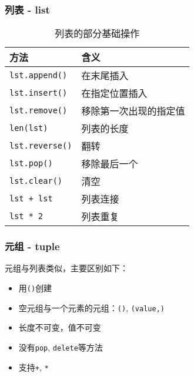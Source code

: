 \documentclass[10pt]{beamer}
\begin{document}
\begin{frame}
    \frametitle{列表 - list}

    \begin{table}
    \caption{列表的部分基础操作}    
    \begin{tabular}{ll}
    \toprule
    方法 & 含义 \\ \midrule
    \texttt{lst.append()} & 在末尾插入 \\
    \texttt{lst.insert()} & 在指定位置插入 \\
    \texttt{lst.remove()} & 移除第一次出现的指定值 \\
    \texttt{len(lst)} & 列表的长度 \\
    \texttt{lst.reverse()} & 翻转 \\
    \texttt{lst.pop()} & 移除最后一个 \\
    \texttt{lst.clear()} & 清空 \\
    \texttt{lst + lst} & 列表连接 \\
    \texttt{lst * 2} & 列表重复 \\
    \bottomrule
    \end{tabular}
    \end{table}    

\end{frame}


\begin{frame}
    \frametitle{元组 - tuple}

    元组与列表类似，主要区别如下：
    \begin{itemize}
        \item 用\texttt{()}创建
        \item 空元组与一个元素的元组：\texttt{()}, \texttt{(value,)}
        \item 长度不可变，值不可变
        \item 没有\texttt{pop}, \texttt{delete}等方法
        \item 支持\texttt{+}, \texttt{*}
    \end{itemize}

\end{frame}
\end{document}
